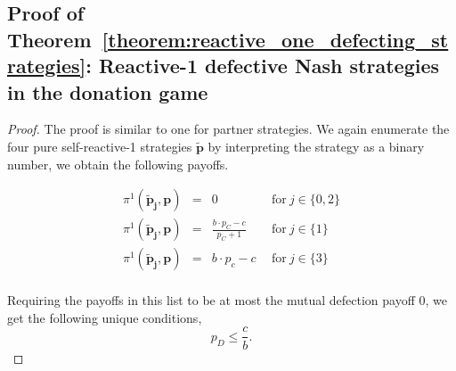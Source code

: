 \documentclass[11pt]{article}
\theoremstyle{plainCl1}
\theoremstyle{plainCl2}
\begin{document}
\subsection{Proof of Theorem~\ref{theorem:reactive_one_defecting_strategies}:
Reactive-1 defective Nash strategies in the donation game}
\begin{proof}
The proof is similar to one for partner strategies. We again enumerate the four
pure self-reactive-1 strategies  $\mathbf{\tilde p}$  by interpreting the
strategy as a binary number, we obtain the following payoffs.

\begin{equation*}\label{Eq:PayoffExpressionsDefectiveReactiveOne}
  \begin{array}{lcll}
   \pi^1(\mathbf{\tilde p_j},\mathbf{p}) &= &\displaystyle 0 & ~~\text{for}~ j\! \in\!  \{0, 2\} \\[0.3cm]
   \pi^1(\mathbf{\tilde p_j},\mathbf{p}) &= &\displaystyle  \frac{b \cdot p_{C} - c}{p_{C} + 1}  & ~~\text{for}~ j\! \in\!  \{1\} \\[0.3cm]
   \pi^1(\mathbf{\tilde p_j},\mathbf{p}) &= &\displaystyle  b \cdot p_{c} - c  & ~~\text{for}~ j\! \in\!  \{3\} \\[0.3cm]
  \end{array}
\end{equation*}

Requiring the payoffs in this list to be at most the mutual defection payoff $0$, we get the following unique conditions,
\begin{equation*}
 p_{D}  \le \frac{c}{b}.
\end{equation*}
\end{proof}

\end{document}

